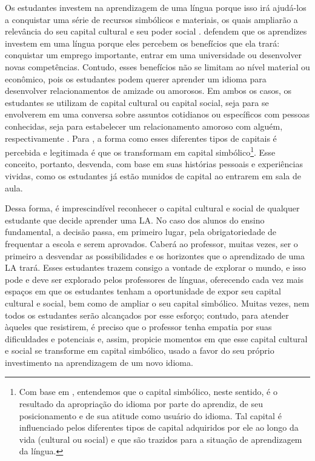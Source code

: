 \documentclass{textolivre}
\begin{document}
Os estudantes investem na aprendizagem de uma língua porque isso irá ajudá-los a conquistar uma série de recursos simbólicos e materiais, os quais ampliarão a relevância do seu capital cultural e seu poder social \cite{norton2013}. \textcite{darvin2016} defendem que os aprendizes investem em uma língua porque eles percebem os benefícios que ela trará: conquistar um emprego importante, entrar em uma universidade ou desenvolver novas competências. Contudo, esses benefícios não se limitam ao nível material ou econômico, pois os estudantes podem querer aprender um idioma para desenvolver relacionamentos de amizade ou amorosos. Em ambos os casos, os estudantes se utilizam de capital cultural ou capital social, seja para se envolverem em uma conversa sobre assuntos cotidianos ou específicos com pessoas conhecidas, seja para estabelecer um relacionamento amoroso com alguém, respectivamente \cite{darvin2016}. Para \textcite[p. 4]{bourdieu1987}, a forma como esses diferentes tipos de capitais é percebida e legitimada é que os transformam em capital simbólico\footnote{Com base em \textcite{bourdieu1987, darvin2016}, entendemos que o capital simbólico, neste sentido, é o resultado da apropriação do idioma por parte do aprendiz, de seu posicionamento e de sua atitude como usuário do idioma. Tal capital é influenciado pelos diferentes tipos de capital adquiridos por ele ao longo da vida (cultural ou social) e que são trazidos para a situação de aprendizagem da língua.}. Esse conceito, portanto, desvenda, com base em suas histórias pessoais e experiências vividas, como os estudantes já estão munidos de capital ao entrarem em sala de aula.  

Dessa forma, é imprescindível reconhecer o capital cultural e social de qualquer estudante que decide aprender uma LA. No caso dos alunos do ensino fundamental, a decisão passa, em primeiro lugar, pela obrigatoriedade de frequentar a escola e serem aprovados. Caberá ao professor, muitas vezes, ser o primeiro a desvendar as possibilidades e os horizontes que o aprendizado de uma LA trará. Esses estudantes trazem consigo a vontade de explorar o mundo, e isso pode e deve ser explorado pelos professores de línguas, oferecendo cada vez mais espaços em que os estudantes tenham a oportunidade de expor seu capital cultural e social, bem como de ampliar o seu capital simbólico. Muitas vezes, nem todos os estudantes serão alcançados por esse esforço; contudo, para atender àqueles que resistirem, é preciso que o professor tenha empatia por suas dificuldades e potenciais e, assim, propicie momentos em que esse capital cultural e social se transforme em capital simbólico, usado a favor do seu próprio investimento na aprendizagem de um novo idioma.
\end{document}
